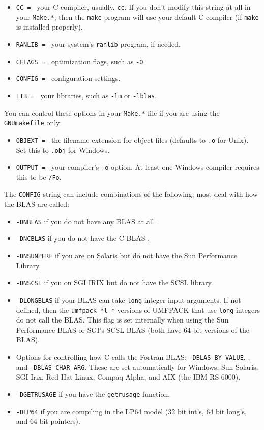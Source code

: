 \begin{itemize}
\item {\tt CC = } your C compiler, usually, {\tt cc}.  If you don't modify
    this string at all in your {\tt Make.*}, then the {\tt make} program will
    use your default C compiler (if {\tt make} is installed properly).
\item {\tt RANLIB = } your system's {\tt ranlib} program, if needed.
\item {\tt CFLAGS = } optimization flags, such as {\tt -O}.
\item {\tt CONFIG = } configuration settings.
\item {\tt LIB = } your libraries, such as {\tt -lm} or {\tt -lblas}.
\end{itemize}

You can control these options in your {\tt Make.*} file
if you are using the {\tt GNUmakefile} only:
\begin{itemize}
\item {\tt OBJEXT = } the filename extension for object files
    (defaults to {\tt .o} for Unix).  Set this to {\tt .obj} for Windows.
\item {\tt OUTPUT = } your compiler's {\tt -o} option.  At least one
    Windows compiler requires this to be {\tt /Fo}.
\end{itemize}

The {\tt CONFIG} string can include combinations of the following;
most deal with how the BLAS are called:
\begin{itemize}
\item {\tt -DNBLAS} if you do not have any BLAS at all.
\item {\tt -DNCBLAS} if you do not have the C-BLAS \cite{ATLAS}.
\item {\tt -DNSUNPERF} if you are on Solaris but do not have the Sun
    Performance Library.
\item {\tt -DNSCSL} if you on SGI IRIX but do not have the SCSL library.
\item {\tt -DLONGBLAS} if your BLAS can take {\tt long} integer input
    arguments.  If not defined, then the {\tt umfpack\_*l\_*} versions of
    UMFPACK that use {\tt long} integers do not call the BLAS.
    This flag is set internally when using the Sun Performance BLAS
    or SGI's SCSL BLAS (both have 64-bit versions of the BLAS).
\item Options for controlling how C calls the Fortran BLAS:
    {\tt -DBLAS\_BY\_VALUE}, ,
    and {\tt -DBLAS\_CHAR\_ARG}.  These are set automatically for Windows,
    Sun Solaris, SGI Irix, Red Hat Linux, Compaq Alpha, and
    AIX (the IBM RS 6000).
\item {\tt -DGETRUSAGE} if you have the {\tt getrusage} function.
\item {\tt -DLP64} if you are compiling in the LP64 model (32 bit int's,
    64 bit long's, and 64 bit pointers).
\end{itemize}

